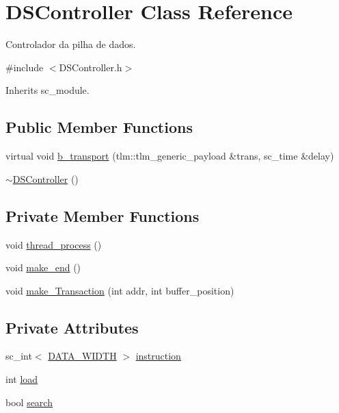 \hypertarget{classDSController}{\section{D\+S\+Controller Class Reference}
\label{classDSController}
}


Controlador da pilha de dados.  




{\ttfamily \#include $<$D\+S\+Controller.\+h$>$}



Inherits sc\+\_\+module.

\subsection*{Public Member Functions}
\begin{DoxyCompactItemize}
\item 
virtual void \hyperlink{classDSController_a75312e372faecd96680be6bcee7dd503}{b\+\_\+transport} (tlm\+::tlm\+\_\+generic\+\_\+payload \&trans, sc\+\_\+time \&delay)
\item 
\hyperlink{classDSController_a8c14a3305d138b7917f74aec1b043bc3}{$\sim$\+D\+S\+Controller} ()
\end{DoxyCompactItemize}
\subsection*{Private Member Functions}
\begin{DoxyCompactItemize}
\item 
void \hyperlink{classDSController_a847631eb838904625c7640f2404406c7}{thread\+\_\+process} ()
\item 
void \hyperlink{classDSController_abb1fd57d2637a10bf495e58f2fe295c6}{make\+\_\+end} ()
\item 
void \hyperlink{classDSController_af78323c904be8c22fa28d992d9bfa684}{make\+\_\+\+Transaction} (int addr, int buffer\+\_\+position)
\end{DoxyCompactItemize}
\subsection*{Private Attributes}
\begin{DoxyCompactItemize}
\item 
sc\+\_\+int$<$ \hyperlink{Defines_8h_af087b76f9707be9d3b43ba0c782c31c3}{D\+A\+T\+A\+\_\+\+W\+I\+D\+T\+H} $>$ \hyperlink{classDSController_afc4cc29171d5dabef923c07556b7f7db}{instruction}
\item 
int \hyperlink{classDSController_a60ba7f65ce563b1125475dd5352ea5ec}{load}
\item 
bool \hyperlink{classDSController_abd0050ab6f0971ad0135d158bdf0f430}{search}
\end{DoxyCompactItemize}


